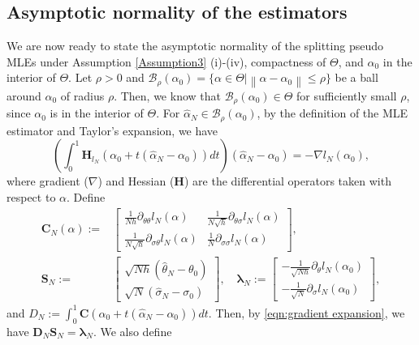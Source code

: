 \documentclass[a4paper,12pt]{article}
\numberwithin{equation}{section}
\theoremstyle{plain}
\theoremstyle{definition}
\begin{document}
\subsection{Asymptotic normality of the estimators}
We are now ready to state the asymptotic normality of the splitting pseudo MLEs under Assumption \ref{Assumption3} (i)-(iv), compactness of $\Theta$,  and $\alpha_0$ in the interior of $\Theta$. Let $\rho>0$ and $\mathcal{B}_\rho(\alpha_0)=\{\alpha\in \Theta|\left\|\alpha-\alpha_0\right\|\leq \rho\}$ be a ball around $\alpha_0$ of radius $\rho$. Then, we know that $\mathcal{B}_\rho(\alpha_0)\in \Theta$ for sufficiently small $\rho$, since $\alpha_0$ is in the interior of $\Theta$. For $\hat{\alpha}_N\in \mathcal{B}_\rho(\alpha_0)$, by the definition of the MLE estimator and Taylor's expansion, we have
\begin{equation}\label{eqn:gradient expansion}
    \left(\int_0^1\mathbf{H}_{l_N}\left(\alpha_0+t(\hat{\alpha}_N-\alpha_0)\right)dt\right)(\hat{\alpha}_N-\alpha_0)=-\nabla l_N(\alpha_0),
\end{equation}
where gradient ($\nabla$) and Hessian ($\mathbf{H}$) are the differential operators taken with respect to $\alpha$. Define 
\begin{align}
    \mathbf{C}_N(\alpha):=&\left[\begin{array}{cc}
\frac{1}{N h} \partial_{\theta\theta} l_N(\alpha) & \frac{1}{N \sqrt{h}} \partial_{\theta\sigma} l_N(\alpha) \\
\frac{1}{N \sqrt{h}} \partial_{\sigma\theta} l_N(\alpha) & \frac{1}{N} \partial_{\sigma\sigma} l_N(\alpha)
\end{array}\right],\label{eqn:C_N alpha}\\
\mathbf{S}_N:=&\left[\begin{array}{c}
\sqrt{N h}\left(\hat{\theta}_N-\theta_0\right) \\
\sqrt{N}\left(\hat{\sigma}_N-\sigma_0\right)
\end{array}\right],\quad \mathbf{\lambda}_N:=\left[\begin{array}{c}
-\frac{1}{\sqrt{N h}} \partial_\theta l_N\left(\alpha_0\right) \\
-\frac{1}{\sqrt{N}} \partial_\sigma l_N\left(\alpha_0\right)
\end{array}\right],\label{eqn:S_N lambda_N}
\end{align}
and $D_N:=\int_0^1\mathbf{C}(\alpha_0+t(\hat{\alpha}_N-\alpha_0))dt$. Then, by \eqref{eqn:gradient expansion}, we have $\mathbf{D}_N \mathbf{S}_N=\mathbf{\lambda}_N$. We also define
\end{document}
